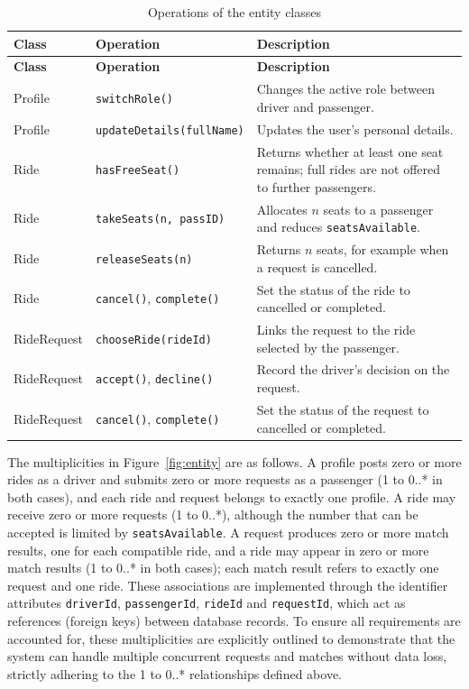 \begingroup\small
\begin{longtable}{@{}>{\raggedright\arraybackslash}p{}
                   >{\raggedright\arraybackslash}p{}
                   >{\raggedright\arraybackslash}p{}@{}}
\caption{Operations of the entity classes}\label{tab:entityops}\\
\toprule
\textbf{Class} & \textbf{Operation} & \textbf{Description} \\
\midrule
\endfirsthead
\toprule
\textbf{Class} & \textbf{Operation} & \textbf{Description} \\
\midrule
\endhead
\bottomrule
\endfoot
Profile & \texttt{switchRole()} & Changes the active role between driver and passenger. \\
Profile & \texttt{updateDetails(fullName)} & Updates the user's personal details. \\
Ride & \texttt{hasFreeSeat()} & Returns whether at least one seat remains; full rides are not offered to further passengers. \\
Ride & \texttt{takeSeats(n, passID)} & Allocates $n$ seats to a passenger and reduces \texttt{seatsAvailable}. \\
Ride & \texttt{releaseSeats(n)} & Returns $n$ seats, for example when a request is cancelled. \\
Ride & \texttt{cancel()}, \texttt{complete()} & Set the status of the ride to cancelled or completed. \\
RideRequest & \texttt{chooseRide(rideId)} & Links the request to the ride selected by the passenger. \\
RideRequest & \texttt{accept()}, \texttt{decline()} & Record the driver's decision on the request. \\
RideRequest & \texttt{cancel()}, \texttt{complete()} & Set the status of the request to cancelled or completed. \\
\end{longtable}
\endgroup

The multiplicities in Figure~\ref{fig:entity} are as follows. A profile posts zero or more rides as a driver and submits zero or more requests as a passenger (1 to 0..* in both cases), and each ride and request belongs to exactly one profile. A ride may receive zero or more requests (1 to 0..*), although the number that can be accepted is limited by \texttt{seatsAvailable}. A request produces zero or more match results, one for each compatible ride, and a ride may appear in zero or more match results (1 to 0..* in both cases); each match result refers to exactly one request and one ride. These associations are implemented through the identifier attributes \texttt{driverId}, \texttt{passengerId}, \texttt{rideId} and \texttt{requestId}, which act as references (foreign keys) between database records. To ensure all requirements are accounted for, these multiplicities are explicitly outlined to demonstrate that the system can handle multiple concurrent requests and matches without data loss, strictly adhering to the 1 to 0..* relationships defined above.

